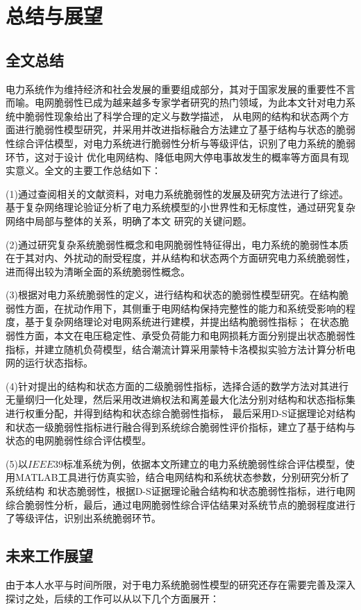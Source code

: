 \chapter{总结与展望}
\label{cha:summery}

\section{全文总结}
\label{sec:sum}
电力系统作为维持经济和社会发展的重要组成部分，其对于国家发展的重要性不言而喻。电网脆弱性已成为越来越多专家学者研究的热门领域，为此本文针对电力系统中脆弱性现象给出了科学合理的定义与数学描述，
从电网的结构和状态两个方面进行脆弱性模型研究，并采用并改进指标融合方法建立了基于结构与状态的脆弱性综合评估模型，对电力系统进行脆弱性分析与等级评估，识别了电力系统的脆弱环节，这对于设计
优化电网结构、降低电网大停电事故发生的概率等方面具有现实意义。全文的主要工作总结如下：

(1)通过查阅相关的文献资料，对电力系统脆弱性的发展及研究方法进行了综述。基于复杂网络理论验证分析了电力系统模型的小世界性和无标度性，通过研究复杂网络中局部与整体的关系，明确了本文
研究的关键问题。

(2)通过研究复杂系统脆弱性概念和电网脆弱性特征得出，电力系统的脆弱性本质在于其对内、外扰动的耐受程度，并从结构和状态两个方面研究电力系统脆弱性，进而得出较为清晰全面的系统脆弱性概念。

(3)根据对电力系统脆弱性的定义，进行结构和状态的脆弱性模型研究。在结构脆弱性方面，在扰动作用下，其侧重于电网结构保持完整性的能力和系统受影响的程度，基于复杂网络理论对电网系统进行建模，并提出结构脆弱性指标；
在状态脆弱性方面，本文在电压稳定性、承受负荷能力和电网损耗方面分别提出状态脆弱性指标，并建立随机负荷模型，结合潮流计算采用蒙特卡洛模拟实验方法计算分析电网的运行状态指标。

(4)针对提出的结构和状态方面的二级脆弱性指标，选择合适的数学方法对其进行无量纲归一化处理，然后采用改进熵权法和离差最大化法分别对结构和状态指标集进行权重分配，并得到结构和状态综合脆弱性指标，
最后采用D-S证据理论对结构和状态一级脆弱性指标进行融合得到系统综合脆弱性评价指标，建立了基于结构与状态的电网脆弱性综合评估模型。

(5)以$IEEE39$标准系统为例，依据本文所建立的电力系统脆弱性综合评估模型，使用MATLAB工具进行仿真实验，结合电网结构和系统状态参数，分别研究分析了系统结构
和状态脆弱性，根据D-S证据理论融合结构和状态脆弱性指标，进行电网综合脆弱性分析，最后，通过电网脆弱性综合评估结果对系统节点的脆弱程度进行了等级评估，识别出系统脆弱环节。

\section{未来工作展望}
\label{sec:feature}
由于本人水平与时间所限，对于电力系统脆弱性模型的研究还存在需要完善及深入探讨之处，后续的工作可以从以下几个方面展开：

